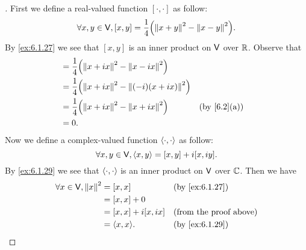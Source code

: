 \begin{proof}[]
	First we define a real-valued function \([\cdot, \cdot]\) as follow:
	\[
		\forall x, y \in \V, [x, y] = \frac{1}{4} \pa{\norm{x + y}^2 - \norm{x - y}^2}.
	\]
	By \cref{ex:6.1.27} we see that \([x, y]\) is an inner product on \(\mathsf{V}\) over \(\mathbb{R}\).
	Observe that
	\begin{align*}
		[x, ix] & = \frac{1}{4} \pa{\norm{x + ix}^2 - \norm{x - ix}^2}                         \\
		        & = \frac{1}{4} \pa{\norm{x + ix}^2 - \norm{(-i) (x + ix)}^2}                  \\
		        & = \frac{1}{4} \pa{\norm{x + ix}^2 - \norm{x + ix}^2}        &  & \by{6.2}[a] \\
		        & = 0.
	\end{align*}
	Now we define a complex-valued function \(\left\langle\cdot, \cdot\right\rangle\) as follow:
	\[
		\forall x, y \in \mathsf{V}, \left\langle x, y\right\rangle = [x, y] + i[x, iy].
	\]
	By \cref{ex:6.1.29} we see that \(\left\langle\cdot, \cdot\right\rangle\) is an inner product on \(\mathsf{V}\) over \(\mathbb{C}\).
	Then we have
	\begin{align*}
		\forall x \in \V, \norm{x}^2 & = [x, x]            &  & \by{ex:6.1.27}                \\
		                             & = [x, x] + 0                                           \\
		                             & = [x, x] + i[x, ix] &  & \text{(from the proof above)} \\
		                             & = \inn{x, x}.       &  & \by{ex:6.1.29}
	\end{align*}
\end{proof}
